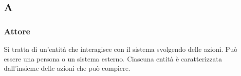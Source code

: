 \subsection{A}

\subsubsection{Attore}
Si tratta di un'entità che interagisce con il sistema svolgendo delle azioni.
Può essere una persona o un sistema esterno. Ciascuna entità è caratterizzata
dall'insieme delle azioni che può compiere.

\newpage
